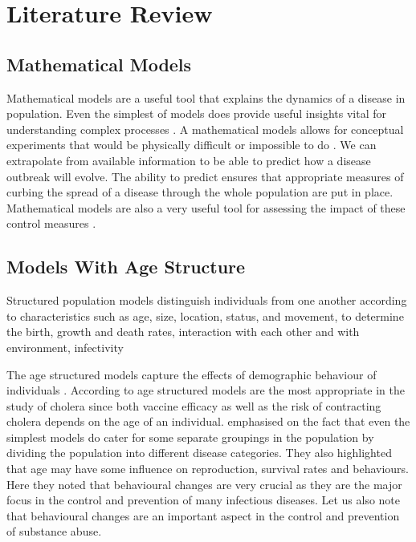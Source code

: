 \chapter{Literature Review}
\section{Mathematical Models}

Mathematical models are a useful tool that explains the dynamics of a disease in population. Even the simplest of models does provide useful insights vital for understanding complex processes \cite{brauer2001mathematical}. A mathematical models allows for conceptual experiments that would be physically difficult or impossible to do \cite{aron2007mathematical}. We can extrapolate from available information to be able to predict how a disease outbreak will evolve. The ability to predict ensures that appropriate measures of curbing the spread of a disease through the whole population are put in place. Mathematical models are also a very useful tool for assessing the impact of these control measures \cite{keeling2009mathematical}.

\section{Models With Age Structure}
Structured population models distinguish individuals from one another according to characteristics such as age, size, location, status, and movement, to determine the birth, growth and death rates, interaction with each other and with environment, infectivity \cite{auger2008structured}



The age structured models capture the effects of demographic behaviour of individuals \cite{liu2015stability}. According to \cite{alexanderian2011age} age structured models are the most appropriate in the study of cholera since both vaccine efficacy as well as the risk of contracting cholera depends on the age of an individual. \cite{li2008continuous} emphasised on the fact that even the simplest models do cater for  some separate groupings in the population by dividing the population into different disease categories. They also highlighted that age may have some influence on reproduction, survival rates and behaviours. Here they noted that behavioural changes are very crucial as they are the major focus in the control and prevention of many infectious diseases. Let us also note that behavioural  changes are  an important aspect in the control and prevention of substance abuse.

